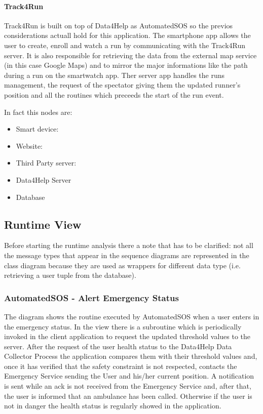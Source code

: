 \documentclass[a4paper]{article}
\begin{document}
\paragraph{Track4Run}
Track4Run is built on top of Data4Help as AutomatedSOS so the previos considerations actuall hold for this application. The smartphone app allows the user to create, enroll and watch a run by communicating with the Track4Run server. It is also responsible for retrieving the data from the external map service (in this case Google Maps) and to mirror the major informations like the path during a run on the smartwatch app. Ther server app handles the runs management, the request of the spectator giving them the updated runner's position and all the routines which preceeds the start of the run event.



In fact this nodes are:


\begin{itemize}
    \item Smart device: 
    \item Website:
    \item Third Party server:
    \item Data4Help Server
    \item Database
\end{itemize}

\clearpage

\subsection{Runtime View}
Before starting the runtime analysis there a note that has to be clarified: not all the message types that appear in the sequence diagrams are represented in the class diagram because they are used as wrappers for different data type (i.e. retrieving a user tuple from the database).

\subsubsection{AutomatedSOS - Alert Emergency Status}
The diagram shows the routine executed by AutomatedSOS when a user enters in the emergency status. In the view there is a subroutine which is periodically invoked in the client application to request the updated threshold values to the server. After the request of the user health status to the Data4Help Data Collector Process the application compares them with their threshold values and, once it has verified that the safety constraint is not respected, contacts the Emergency Service sending the User and his/her current position. A notification is sent while an ack is not received from the Emergency Service and, after that, the user is informed that an ambulance has been called. Otherwise if the user is not in danger the health status is regularly showed in the application.
\end{document}
